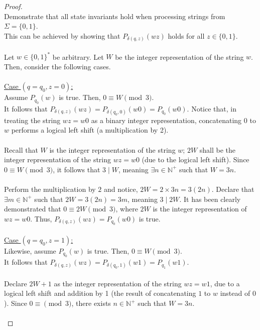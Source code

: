 \documentclass[12pt]{article}
\begin{document}
\begin{proof}
    \\
    Demonstrate that all state invariants hold when processing strings from $\Sigma = \{0, 1\}$. \\
    This can be achieved by showing that $P_{\delta(q, z)}(wz)$ holds for all $z \in \{0, 1\}$. \\
    \\
    Let $w \in \{0, 1\}^*$ be arbitrary. Let $W$ be the integer representation of the string $w$. Then, consider the following cases. \\
    \\
    \underline{Case $(q = q_0, z = 0)$:} \\
    Assume $P_{q_0}(w)$ is true. Then, $0 \equiv W \pmod{3}$. \\
    It follows that $P_{\delta(q, z)}(wz) = P_{\delta(q_0, 0)}(w0) = P_{q_0}(w0)$. Notice that, in treating the string $wz = w0$ as a binary integer representation, concatenating $0$ to $w$ performs a logical left shift (a multiplication by 2). \\
    \\
    Recall that $W$ is the integer representation of the string $w$; $2W$ shall be the integer representation of the string $wz = w0$ (due to the logical left shift). Since $0 \equiv W \pmod{3}$, it follows that $3 \mid W$, meaning $\exists n \in \mathbb{N}^+$ such that $W = 3n$. \\
    \\
    Perform the multiplication by $2$ and notice, $2W = 2 \times 3n = 3(2n)$. Declare that $\exists m \in \mathbb{N}^+$ such that $2W = 3(2n) = 3m$, meaning $3 \mid 2W$. It has been clearly demonstrated that $0 \equiv 2W \pmod{3}$, where $2W$ is the integer representation of $wz = w0$. Thus, $P_{\delta(q, z)}(wz) = P_{q_0}(w0)$ is true. \\
    \\
    \underline{Case $(q = q_0, z = 1)$:} \\
    Likewise, assume $P_{q_0}(w)$ is true. Then, $0 \equiv W \pmod{3}$. \\
    It follows that $P_{\delta(q, z)}(wz) = P_{\delta(q_0, 1)}(w1) = P_{q_1}(w1)$. \\
    \\
    Declare $2W + 1$ as the integer representation of the string $wz = w1$, due to a logical left shift and addition by 1 (the result of concatenating $1$ to $w$ instead of $0$). Since $0 \equiv \pmod{3}$, there exists $n \in \mathbb{N}^+$ such that $W = 3n$. \\
    \\

\end{proof}
\end{document}
